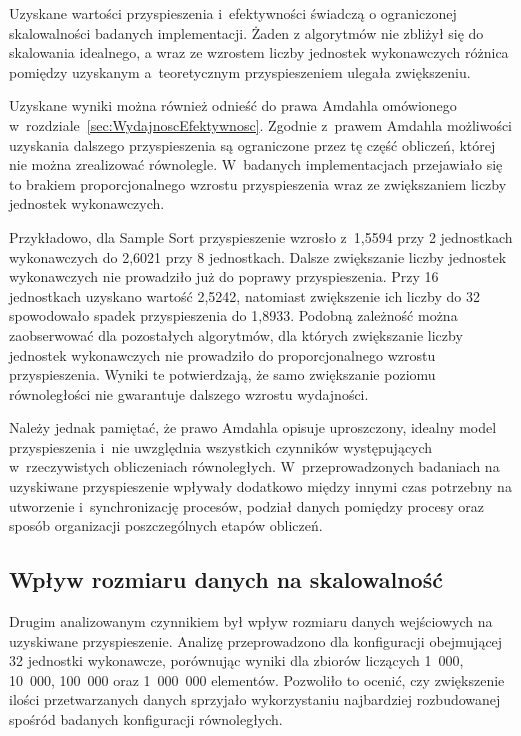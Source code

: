 Uzyskane wartości przyspieszenia i~efektywności świadczą o ograniczonej skalowalności badanych implementacji. 
Żaden z algorytmów nie zbliżył się do skalowania idealnego, a wraz ze wzrostem liczby jednostek wykonawczych 
różnica pomiędzy uzyskanym a~teoretycznym przyspieszeniem ulegała zwiększeniu.

Uzyskane wyniki można również odnieść do prawa Amdahla omówionego w~rozdziale~\ref{sec:WydajnoscEfektywnosc}. 
Zgodnie z~prawem Amdahla możliwości uzyskania dalszego przyspieszenia są ograniczone przez tę część obliczeń, 
której nie można zrealizować równolegle. 
W~badanych implementacjach przejawiało się to brakiem proporcjonalnego wzrostu przyspieszenia wraz ze zwiększaniem liczby jednostek wykonawczych.

Przykładowo, dla Sample Sort przyspieszenie wzrosło z~1,5594 przy 2 jednostkach wykonawczych do 2,6021 przy 8 jednostkach. 
Dalsze zwiększanie liczby jednostek wykonawczych nie prowadziło już do poprawy przyspieszenia. 
Przy 16 jednostkach uzyskano wartość 2,5242, natomiast zwiększenie ich liczby do 32 spowodowało spadek przyspieszenia do 1,8933.
Podobną zależność można zaobserwować dla pozostałych algorytmów, 
dla których zwiększanie liczby jednostek wykonawczych nie prowadziło do proporcjonalnego wzrostu przyspieszenia. 
Wyniki te potwierdzają, że samo zwiększanie poziomu równoległości nie gwarantuje dalszego wzrostu wydajności.

Należy jednak pamiętać, że prawo Amdahla opisuje uproszczony, idealny model przyspieszenia i~nie uwzględnia wszystkich 
czynników występujących w~rzeczywistych obliczeniach równoległych. 
W~przeprowadzonych badaniach na uzyskiwane przyspieszenie wpływały dodatkowo między innymi czas potrzebny na utworzenie 
i~synchronizację procesów, podział danych pomiędzy procesy oraz sposób organizacji poszczególnych etapów obliczeń.

\subsection*{Wpływ rozmiaru danych na skalowalność}

Drugim analizowanym czynnikiem był wpływ rozmiaru danych wejściowych na uzyskiwane przyspieszenie. 
Analizę przeprowadzono dla konfiguracji obejmującej 32 jednostki wykonawcze, 
porównując wyniki dla zbiorów liczących 1~000, 10~000, 100~000 oraz 1~000~000 elementów.
Pozwoliło to ocenić, czy zwiększenie ilości przetwarzanych danych sprzyjało 
wykorzystaniu najbardziej rozbudowanej spośród badanych konfiguracji równoległych.

